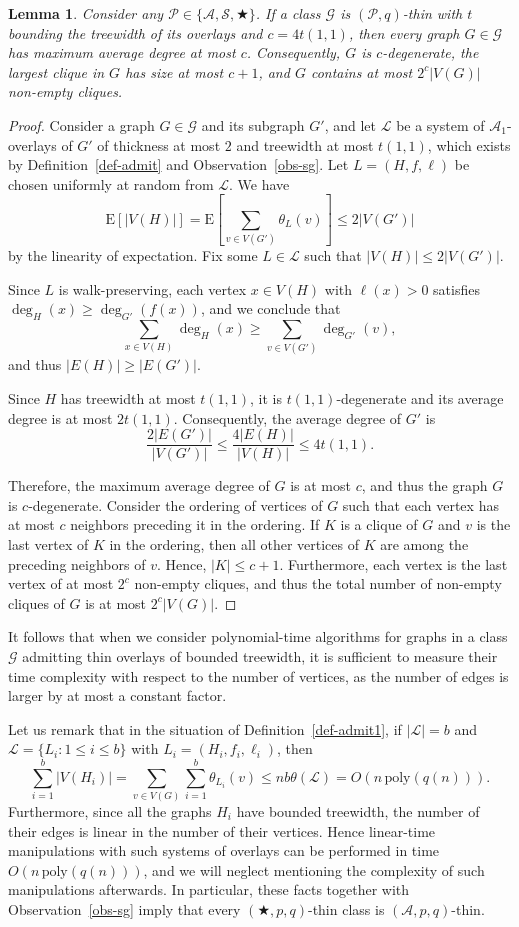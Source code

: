 \documentclass[a4paper,11pt]{article}
\newcommand{\Aa}{{\mathcal A}}
\newcommand{\GG}{{\mathcal G}}
\newcommand{\LL}{{\mathcal L}}
\newcommand{\Ss}{{\mathcal S}}
\newcommand{\PP}{{\mathcal P}}
\newcommand{\poly}{\text{poly}}
\newtheorem{lemma}[theorem]{Lemma}
\begin{document}
\begin{lemma}\label{lemma-nume}
Consider any $\PP\in\{\Aa,\Ss,\bigstar\}$.
If a class $\GG$ is $(\PP,q)$-thin with $t$ bounding the treewidth of its overlays and $c=4t(1,1)$, then
every graph $G\in\GG$ has maximum average degree at most $c$.  Consequently, $G$ is $c$-degenerate,
the largest clique in $G$ has size at most $c+1$, and $G$ contains at most $2^c|V(G)|$ non-empty cliques.
\end{lemma}
\begin{proof}
Consider a graph $G\in\GG$ and its subgraph $G'$, and let $\LL$ be a system of $\Aa_1$-overlays
of $G'$ of thickness at most $2$ and treewidth at most $t(1,1)$, which exists by Definition~\ref{def-admit}
and Observation~\ref{obs-sg}.
Let $L=(H,f,\ell)$ be chosen uniformly at random from $\LL$.  We have
$$\text{E}[|V(H)|]=\text{E}\left[\sum_{v\in V(G')}\theta_L(v)\right]\le 2|V(G')|$$
by the linearity of expectation.  Fix some $L\in \LL$ such that $|V(H)|\le 2|V(G')|$.

Since $L$ is walk-preserving, each vertex $x\in V(H)$ with $\ell(x)>0$ satisfies $\deg_H(x)\ge \deg_{G'}(f(x))$,
and we conclude that $$\sum_{x\in V(H)} \deg_H(x)\ge \sum_{v\in V(G')} \deg_{G'}(v),$$
and thus $|E(H)|\ge |E(G')|$.

Since $H$ has treewidth at most $t(1,1)$, it is $t(1,1)$-degenerate and its average degree is at most $2t(1,1)$.
Consequently, the average degree of $G'$ is
$$\frac{2|E(G')|}{|V(G')|}\le \frac{4|E(H)|}{|V(H)|}\le 4t(1,1).$$

Therefore, the maximum average degree of $G$ is at most $c$, and thus the graph $G$ is $c$-degenerate.  Consider the ordering
of vertices of $G$ such that each vertex has at most $c$ neighbors preceding it in the ordering.
If $K$ is a clique of $G$ and $v$ is the last vertex of $K$ in the ordering, then all other vertices of $K$
are among the preceding neighbors of $v$.  Hence, $|K|\le c+1$.  Furthermore, each vertex is the last vertex
of at most $2^c$ non-empty cliques, and thus the total number of non-empty cliques of $G$ is at most $2^c|V(G)|$.
\end{proof}

It follows that when we consider polynomial-time algorithms for graphs in a class $\GG$ admitting thin overlays of bounded treewidth,
it is sufficient to measure their time complexity with respect to the number of vertices,
as the number of edges is larger by at most a constant factor.

Let us remark that in the situation of Definition~\ref{def-admit1},
if $|\LL|=b$ and $\LL=\{L_i:1\le i\le b\}$
with $L_i=(H_i,f_i,\ell_i)$, then
$$\sum_{i=1}^b |V(H_i)|=\sum_{v\in V(G)}\sum_{i=1}^b \theta_{L_i} (v)\le nb\theta(\LL)=O(n\,\poly(q(n))).$$
Furthermore, since all the graphs $H_i$ have bounded treewidth, the number of their
edges is linear in the number of their vertices.  Hence linear-time manipulations with such systems of overlays
can be performed in time $O(n\,\poly(q(n)))$, and we will neglect mentioning the complexity of such manipulations afterwards.
In particular, these facts together with Observation~\ref{obs-sg} imply that every $(\bigstar,p,q)$-thin class is $(\Aa,p,q)$-thin.
\end{document}
